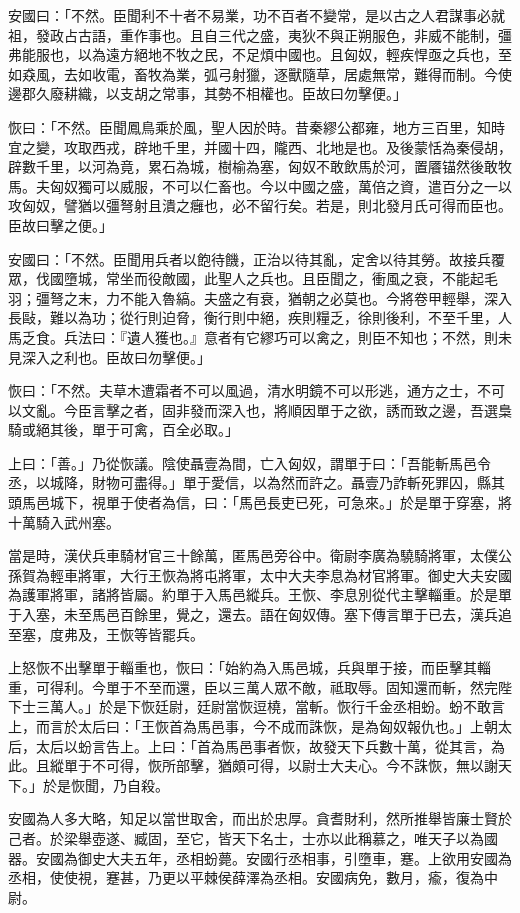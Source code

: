 \begin{pinyinscope}
安國曰：「不然。臣聞利不十者不易業，功不百者不變常，是以古之人君謀事必就祖，發政占古語，重作事也。且自三代之盛，夷狄不與正朔服色，非威不能制，彊弗能服也，以為遠方絕地不牧之民，不足煩中國也。且匈奴，輕疾悍亟之兵也，至如猋風，去如收電，畜牧為業，弧弓射獵，逐獸隨草，居處無常，難得而制。今使邊郡久廢耕織，以支胡之常事，其勢不相權也。臣故曰勿擊便。」

恢曰：「不然。臣聞鳳鳥乘於風，聖人因於時。昔秦繆公都雍，地方三百里，知時宜之變，攻取西戎，辟地千里，并國十四，隴西、北地是也。及後蒙恬為秦侵胡，辟數千里，以河為竟，累石為城，樹榆為塞，匈奴不敢飲馬於河，置餍锚然後敢牧馬。夫匈奴獨可以威服，不可以仁畜也。今以中國之盛，萬倍之資，遣百分之一以攻匈奴，譬猶以彊弩射且潰之癰也，必不留行矣。若是，則北發月氏可得而臣也。臣故曰擊之便。」

安國曰：「不然。臣聞用兵者以飽待饑，正治以待其亂，定舍以待其勞。故接兵覆眾，伐國墮城，常坐而役敵國，此聖人之兵也。且臣聞之，衝風之衰，不能起毛羽；彊弩之末，力不能入魯縞。夫盛之有衰，猶朝之必莫也。今將卷甲輕舉，深入長敺，難以為功；從行則迫脅，衡行則中絕，疾則糧乏，徐則後利，不至千里，人馬乏食。兵法曰：『遺人獲也。』意者有它繆巧可以禽之，則臣不知也；不然，則未見深入之利也。臣故曰勿擊便。」

恢曰：「不然。夫草木遭霜者不可以風過，清水明鏡不可以形逃，通方之士，不可以文亂。今臣言擊之者，固非發而深入也，將順因單于之欲，誘而致之邊，吾選梟騎或絕其後，單于可禽，百全必取。」

上曰：「善。」乃從恢議。陰使聶壹為間，亡入匈奴，謂單于曰：「吾能斬馬邑令丞，以城降，財物可盡得。」單于愛信，以為然而許之。聶壹乃詐斬死罪囚，縣其頭馬邑城下，視單于使者為信，曰：「馬邑長吏已死，可急來。」於是單于穿塞，將十萬騎入武州塞。

當是時，漢伏兵車騎材官三十餘萬，匿馬邑旁谷中。衛尉李廣為驍騎將軍，太僕公孫賀為輕車將軍，大行王恢為將屯將軍，太中大夫李息為材官將軍。御史大夫安國為護軍將軍，諸將皆屬。約單于入馬邑縱兵。王恢、李息別從代主擊輜重。於是單于入塞，未至馬邑百餘里，覺之，還去。語在匈奴傳。塞下傳言單于已去，漢兵追至塞，度弗及，王恢等皆罷兵。

上怒恢不出擊單于輜重也，恢曰：「始約為入馬邑城，兵與單于接，而臣擊其輜重，可得利。今單于不至而還，臣以三萬人眾不敵，祗取辱。固知還而斬，然完陛下士三萬人。」於是下恢廷尉，廷尉當恢逗橈，當斬。恢行千金丞相蚡。蚡不敢言上，而言於太后曰：「王恢首為馬邑事，今不成而誅恢，是為匈奴報仇也。」上朝太后，太后以蚡言告上。上曰：「首為馬邑事者恢，故發天下兵數十萬，從其言，為此。且縱單于不可得，恢所部擊，猶頗可得，以尉士大夫心。今不誅恢，無以謝天下。」於是恢聞，乃自殺。

安國為人多大略，知足以當世取舍，而出於忠厚。貪耆財利，然所推舉皆廉士賢於己者。於梁舉壺遂、臧固，至它，皆天下名士，士亦以此稱慕之，唯天子以為國器。安國為御史大夫五年，丞相蚡薨。安國行丞相事，引墮車，蹇。上欲用安國為丞相，使使視，蹇甚，乃更以平棘侯薛澤為丞相。安國病免，數月，瘉，復為中尉。


\end{pinyinscope}
